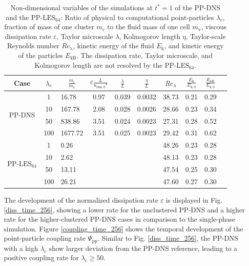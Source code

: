 \documentclass[11pt,a4paper,openany,oneside,parskip=half*]{article}
\begin{document}
\begin{table}[tbp]
	\centering
	\begin{tabular}{| c | c l | c c c c c c c |}
	\hline
	Case & $\lambda_\mathrm{c}$& \multicolumn{1}{c|}{$\frac{m_\mathrm{c}}{m_\mathrm{v}}$} &$\varepsilon \frac{L}{{u_\mathrm{rms,0}}^3}$ & $\frac{\lambda}{L}$ & $\frac{\eta}{L} $ & $Re_\lambda$ & $\frac{E_\mathrm{k}}{E_\mathrm{k,0}}$ & $\frac{E_\mathrm{kB}}{E_\mathrm{k,0}}$ & \\[2pt]
	\hline
	\hline
	\multirow{4}{*}{PP-DNS}
	&1 &16.78 & 0.97& 0.039 & 0.0032 & 38.73 & 0.21 & 0.29 &\\
	&10 &167.78 & 2.08 & 0.028 & 0.0026 & 28.66 & 0.23 & 0.34 &\\
	&50 &838.86 & 3.51 & 0.024 & 0.0023 & 27.31 & 0.28 & 0.52 &\\
	&100 &1677.72 & 3.51 & 0.025 & 0.0023 & 29.42 & 0.31 & 0.62 &\\
	\hline
	\hline
	\multirow{4}{*}{PP-$\mathrm{LES_{64}}$}
	&1 & 0.26 & &  &  & 48.26 & 0.23 & 0.28 &\\
	&10 & 2.62 & &  &  & 48.13 & 0.23 & 0.28 &\\
	&50 & 13.11 & &  &  & 47.54 & 0.25 & 0.30 &\\
	&100 & 26.21 & &  &  & 47.60 & 0.27 & 0.30 &\\
	\hline
	\end{tabular}
	\captionsetup{width=1\linewidth}
	\captionsetup{font=footnotesize}
	\caption{Non-dimensional variables of the simulations at $t^*=1$ of the PP-DNS and the PP-$\mathrm{LES_{64}}$: Ratio of physical to computational point-particles $\lambda_\mathrm{c}$, fraction of mass of one cluster $m_\mathrm{c}$ to the fluid mass of one cell $m_\mathrm{v}$, viscous dissipation rate $\varepsilon$, Taylor microscale $\lambda$, Kolmogorov length $\eta$, Taylor-scale Reynolds number $Re_\mathrm{\lambda}$, kinetic energy of the fluid $E_\mathrm{k}$, and kinetic energy of the particles $E_\mathrm{kB}$. The dissipation rate, Taylor microscale, and Kolmogorov length are not resolved by the PP-$\mathrm{LES_{64}}$.}
	\label{table_values_DNS_LES}
\end{table}%
The development of the normalized dissipation rate $\varepsilon$ is displayed in Fig. \ref{diss_time_256}, showing a lower rate for the unclustered PP-DNS and a higher rate for the higher-clustered PP-DNS cases in comparison to the single-phase simulation.
\newline %
Figure \ref{coupling_time_256} shows the temporal development of the point-particle coupling rate $\Psi_\mathrm{pp}$. Similar to Fig. \ref{diss_time_256}, the PP-DNS with a high $\lambda_\mathrm{c}$ show larger deviation from the PP-DNS reference, leading to a positive coupling rate for $\lambda_\mathrm{c} \geq 50$.
\end{document}
